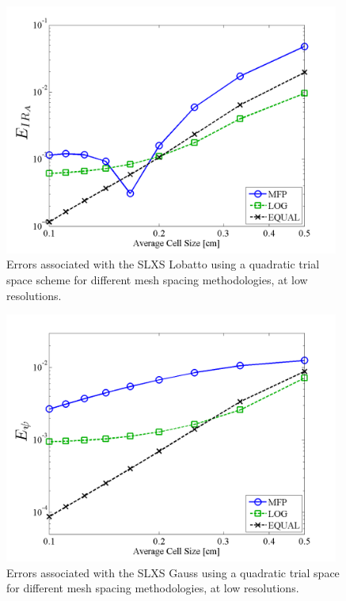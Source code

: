 \pagebreak
%
\begin{figure}[!htp]
\centering
\includegraphics[width=11cm]{chapter3_variable_xs/LOW_RES_P2_LOBATTO_E_IR_A.png}
\caption{Errors associated with the SLXS Lobatto using a quadratic trial space scheme for different mesh spacing methodologies, at low resolutions.}
\label{fig:low_res_lobatto_ir_A}
\end{figure}
\begin{figure}[!hbp]
\centering
\includegraphics[width=11cm]{chapter3_variable_xs/LOW_RES_P2_GAUSS_E_PSI.png}
\caption{Errors associated with the SLXS Gauss using a quadratic trial space for different mesh spacing methodologies, at low resolutions.}
\label{fig:low_res_gauss_psi}
\end{figure}
%
